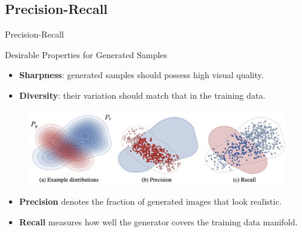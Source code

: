 \documentclass{beamer}
\begin{document}
\subsection{Precision-Recall}
\begin{frame}{Precision-Recall}
	\vspace{-0.5cm}
	\begin{block}{Desirable Properties for Generated Samples}
		\begin{itemize}
			\item \textbf{Sharpness}: generated samples should possess high visual quality.
			\item \textbf{Diversity}: their variation should match that in the training data.
		\end{itemize}
	\end{block}
	\eqpause
	\vspace{-0.5cm}
	\begin{figure}
		\includegraphics[width=0.95\linewidth]{figs/pr_curve}
	\end{figure}
	\vspace{-0.3cm}
	\begin{itemize}
		\item \textbf{Precision} denotes the fraction of generated images that look realistic.
		\item \textbf{Recall} measures how well the generator covers the training data manifold.
	\end{itemize}
\end{frame}
\end{document}
